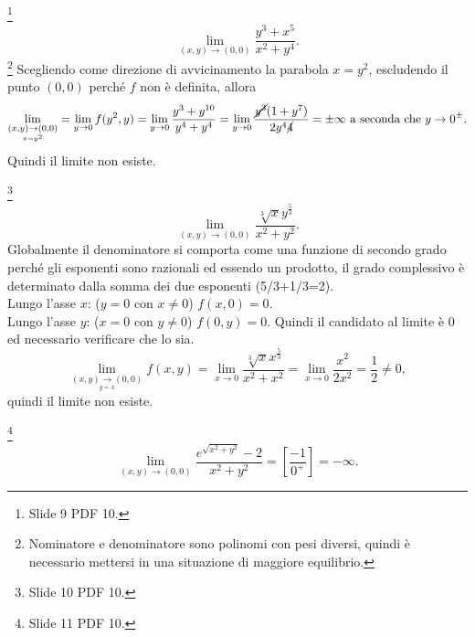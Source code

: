 \begin{example}\footnote{Slide 9 PDF 10.}
    \begin{equation*}
        \lim_{(x,y)\rightarrow(0,0)}\frac{y^3+x^5}{x^2+y^4}.
    \end{equation*}
    \footnote{Nominatore e denominatore sono polinomi con pesi diversi, quindi è necessario mettersi in una situazione di maggiore equilibrio.} Scegliendo come direzione di avvicinamento la parabola $x=y^2$, escludendo il punto $(0,0)$ perché $f$ non è definita, allora
    \begin{equation*}
        \lim_{\underset{x=y^2}{(x,y)\rightarrow(0,0)}}=\lim_{y\rightarrow 0}f(y^2, y)=\lim_{y\rightarrow 0}\frac{y^3+y^{10}}{y^4+y^4}=\lim_{y\rightarrow 0}\frac{\cancel{y^3}(1+y^7)}{2y^4\cancel{4}}=\pm\infty \text{ a seconda che }y\rightarrow 0^{\pm}.
    \end{equation*}
    Quindi il limite non esiste.
\end{example}

\begin{example}\footnote{Slide 10 PDF 10.}
    \begin{equation*}
        \lim_{(x,y)\rightarrow(0,0)}\frac{\sqrt[3]{x}y^{\frac{5}{3}}}{x^2+y^2}.
    \end{equation*}
    Globalmente il denominatore si comporta come una funzione di secondo grado perché gli esponenti sono razionali ed essendo un prodotto, il grado complessivo è determinato dalla somma dei due esponenti (5/3+1/3=2).\\
    Lungo l'asse $x$: ($y=0$ con $x\neq 0$) $f(x,0)=0$.\\
    Lungo l'asse $y$: ($x=0$ con $y\neq 0$) $f(0, y)=0$.
    Quindi il candidato al limite è 0 ed necessario verificare che lo sia.
    \begin{equation*}
        \lim_{\underset{y=x}{(x,y)\rightarrow(0,0)}}f(x,y)=\lim_{x\rightarrow 0}\frac{\sqrt[3]{x}x^{\frac{5}{3}}}{x^2+x^2}=\lim_{x\rightarrow 0}\frac{x^2}{2x^2}=\frac{1}{2}\neq 0,
    \end{equation*}
    quindi il limite non esiste.
\end{example}

\begin{example}\footnote{Slide 11 PDF 10.}
    \begin{equation*}
        \lim_{(x,y)\rightarrow(0,0)}\frac{e^{\sqrt{x^2+y^2}}-2}{x^2+y^2}=\left[\frac{-1}{0^+}\right]=-\infty.
    \end{equation*}
\end{example}

